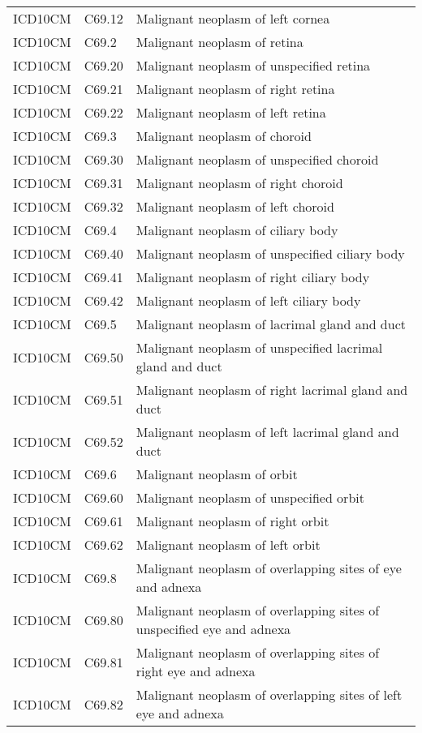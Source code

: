 \begin{longtable}{p{}p{}p{}}
  ICD10CM & C69.12 & Malignant neoplasm of left cornea \\ 
  ICD10CM & C69.2 & Malignant neoplasm of retina \\ 
  ICD10CM & C69.20 & Malignant neoplasm of unspecified retina \\ 
  ICD10CM & C69.21 & Malignant neoplasm of right retina \\ 
  ICD10CM & C69.22 & Malignant neoplasm of left retina \\ 
  ICD10CM & C69.3 & Malignant neoplasm of choroid \\ 
  ICD10CM & C69.30 & Malignant neoplasm of unspecified choroid \\ 
  ICD10CM & C69.31 & Malignant neoplasm of right choroid \\ 
  ICD10CM & C69.32 & Malignant neoplasm of left choroid \\ 
  ICD10CM & C69.4 & Malignant neoplasm of ciliary body \\ 
  ICD10CM & C69.40 & Malignant neoplasm of unspecified ciliary body \\ 
  ICD10CM & C69.41 & Malignant neoplasm of right ciliary body \\ 
  ICD10CM & C69.42 & Malignant neoplasm of left ciliary body \\ 
  ICD10CM & C69.5 & Malignant neoplasm of lacrimal gland and duct \\ 
  ICD10CM & C69.50 & Malignant neoplasm of unspecified lacrimal gland and duct \\ 
  ICD10CM & C69.51 & Malignant neoplasm of right lacrimal gland and duct \\ 
  ICD10CM & C69.52 & Malignant neoplasm of left lacrimal gland and duct \\ 
  ICD10CM & C69.6 & Malignant neoplasm of orbit \\ 
  ICD10CM & C69.60 & Malignant neoplasm of unspecified orbit \\ 
  ICD10CM & C69.61 & Malignant neoplasm of right orbit \\ 
  ICD10CM & C69.62 & Malignant neoplasm of left orbit \\ 
  ICD10CM & C69.8 & Malignant neoplasm of overlapping sites of eye and adnexa \\ 
  ICD10CM & C69.80 & Malignant neoplasm of overlapping sites of unspecified eye and adnexa \\ 
  ICD10CM & C69.81 & Malignant neoplasm of overlapping sites of right eye and adnexa \\ 
  ICD10CM & C69.82 & Malignant neoplasm of overlapping sites of left eye and adnexa \\ 

\end{longtable}
